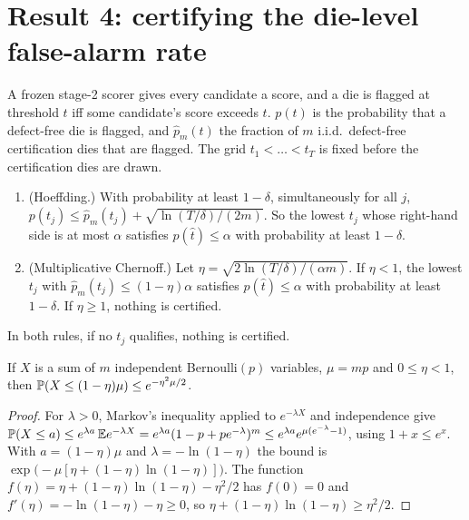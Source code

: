 \section{Result 4: certifying the die-level false-alarm rate}
\label{sec:result-4}

A frozen stage-2 scorer gives every candidate a score, and a die is flagged at threshold $t$ iff
some candidate's score exceeds $t$. $p(t)$ is the probability that a defect-free die is flagged,
and $\hat p_m(t)$ the fraction of $m$ i.i.d.\ defect-free certification dies that are flagged.
The grid $t_1<\dots<t_T$ is fixed before the certification dies are drawn.

\begin{theorem}[Result 4]
\label{thm:4}
\begin{enumerate}[label=(\roman*)]
  \item (Hoeffding.) With probability at least $1-\delta$, simultaneously for all $j$,
  $p(t_j)\le\hat p_m(t_j)+\sqrt{\ln(T/\delta)/(2m)}$. So the lowest $t_j$ whose right-hand side is at
  most $\alpha$ satisfies $p(\hat t)\le\alpha$ with probability at least $1-\delta$.
  \item (Multiplicative Chernoff.) Let $\eta=\sqrt{2\ln(T/\delta)/(\alpha m)}$. If $\eta<1$, the lowest
  $t_j$ with $\hat p_m(t_j)\le(1-\eta)\alpha$ satisfies $p(\hat t)\le\alpha$ with probability at least
  $1-\delta$. If $\eta\ge1$, nothing is certified.
\end{enumerate}
In both rules, if no $t_j$ qualifies, nothing is certified.
\end{theorem}

\begin{lemma}
\label{lem:chernoff}
If $X$ is a sum of $m$ independent Bernoulli$(p)$ variables, $\mu=mp$ and $0\le\eta<1$, then
$\P(X\le(1-\eta)\mu)\le e^{-\eta^2\mu/2}$.
\end{lemma}
\begin{proof}
For $\lambda>0$, Markov's inequality applied to $e^{-\lambda X}$ and independence give
$\P(X\le a)\le e^{\lambda a}\,\E e^{-\lambda X}=e^{\lambda a}(1-p+pe^{-\lambda})^m\le e^{\lambda a}e^{\mu(e^{-\lambda}-1)}$,
using $1+x\le e^x$. With $a=(1-\eta)\mu$ and $\lambda=-\ln(1-\eta)$ the bound is
$\exp\bigl(-\mu[\eta+(1-\eta)\ln(1-\eta)]\bigr)$. The function $f(\eta)=\eta+(1-\eta)\ln(1-\eta)-\eta^2/2$ has
$f(0)=0$ and $f'(\eta)=-\ln(1-\eta)-\eta\ge0$, so $\eta+(1-\eta)\ln(1-\eta)\ge\eta^2/2$.
\end{proof}


